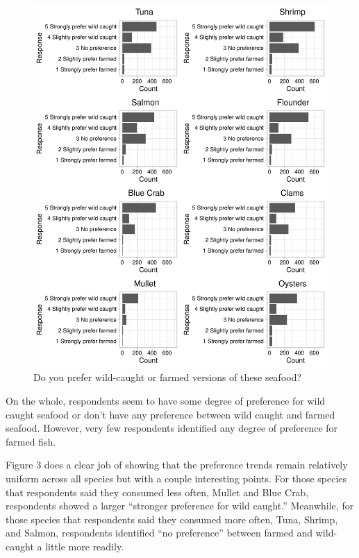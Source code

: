 \documentclass[
  12pt,
]{article}
\begin{document}
\begin{figure}
\centering
\includegraphics{Final_rmd_files/figure-latex/preference-1.pdf}
\caption{Do you prefer wild-caught or farmed versions of these seafood?}
\end{figure}

On the whole, respondents seem to have some degree of preference for
wild caught seafood or don't have any preference between wild caught and
farmed seafood. However, very few respondents identified any degree of
preference for farmed fish.

Figure 3 does a clear job of showing that the preference trends remain
relatively uniform across all species but with a couple interesting
points. For those species that respondents said they consumed less
often, Mullet and Blue Crab, respondents showed a larger ``stronger
preference for wild caught.'' Meanwhile, for those species that
respondents said they consumed more often, Tuna, Shrimp, and Salmon,
respondents identified ``no preference'' between farmed and wild-caught
a little more readily.

\newpage
\end{document}
